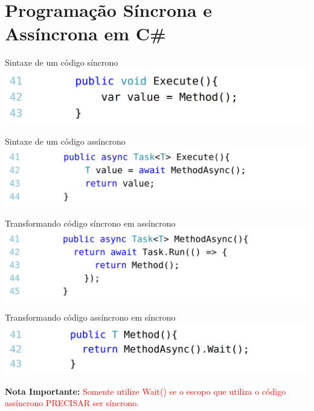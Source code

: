 \documentclass[10pt]{beamer}
\begin{document}
\section{Programação Síncrona e Assíncrona em C\#}

\begin{frame}{Sintaxe de um código síncrono}
	\includegraphics[scale=0.28]{imgs/00-sync.png}
\end{frame}

\begin{frame}{Sintaxe de um código assíncrono}
	\includegraphics[width=\textwidth]{imgs/01-async.png}
\end{frame}

\begin{frame}{Transformando código síncrono em assíncrono}
	\includegraphics[width=\textwidth]{imgs/02-syncToAsync.png}
\end{frame}

\begin{frame}{Transformando código assíncrono em síncrono}
	\includegraphics[scale=0.285]{imgs/03-asyncToSync.png}
	\vspace{0.5cm}
	
	\textbf{Nota Importante:} \textcolor{red}{Somente utilize Wait() se o escopo que utiliza o código assíncrono PRECISAR ser síncrono.}
\end{frame}
\end{document}
